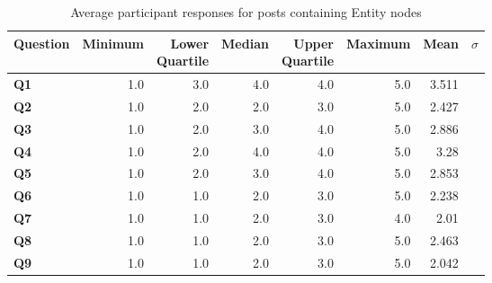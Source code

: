 \begin{table}
\centering
\caption{Average participant responses for posts containing Entity nodes}
\label{table:perception:entity-average}
\begin{tabular}{ l | r | r | r | r | r | r | r}
\textbf{Question} & \textbf{Minimum} & \pbox{2cm}{\textbf{Lower}\\ \textbf{Quartile}} & \textbf{Median} & \pbox{2cm}{\textbf{Upper}\\ \textbf{Quartile}} & \textbf{Maximum} & \textbf{Mean} & \textbf{$\sigma$}\\
\hline
\textbf{Q1} &  1.0 & 3.0 & 4.0 & 4.0 & 5.0 & 3.511 &  \\
\hline
\textbf{Q2} &  1.0 & 2.0 & 2.0 & 3.0 & 5.0 & 2.427 &  \\
\hline
\textbf{Q3} &  1.0 & 2.0 & 3.0 & 4.0 & 5.0 & 2.886 &  \\
\hline
\textbf{Q4} &  1.0 & 2.0 & 4.0 & 4.0 & 5.0 & 3.28 &  \\
\hline
\textbf{Q5} &  1.0 & 2.0 & 3.0 & 4.0 & 5.0 & 2.853 &  \\
\hline
\textbf{Q6} &  1.0 & 1.0 & 2.0 & 3.0 & 5.0 & 2.238 &  \\
\hline
\textbf{Q7} &  1.0 & 1.0 & 2.0 & 3.0 & 4.0 & 2.01 &  \\
\hline
\textbf{Q8} &  1.0 & 1.0 & 2.0 & 3.0 & 5.0 & 2.463 &  \\
\hline
\textbf{Q9} &  1.0 & 1.0 & 2.0 & 3.0 & 5.0 & 2.042 &  \\
\end{tabular}
\end{table}




